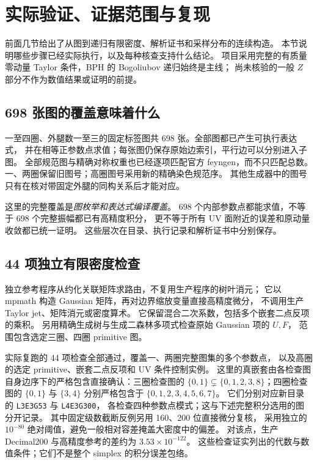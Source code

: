 \section{实际验证、证据范围与复现}

前面几节给出了从图到递归有限密度、解析证书和采样分布的连续构造。
本节说明哪些步骤已经实际执行，以及每种核查支持什么结论。
项目采用完整的有质量零动量 Taylor 条件，BPH 的 Bogoliubov 递归始终是主线；
尚未核验的一般 $Z$ 部分不作为数值结果或证明的前提。

\subsection{698 张图的覆盖意味着什么}

一至四圈、外腿数一至三的固定标签图共 698 张。全部图都已产生可执行表达式，
并在相等正参数点求值；每张图仍保存原始边索引，平行边可以分别进入子图。
全部规范图与精确对称权重也已经逐项匹配官方 feyngen，而不只匹配总数。
一、两圈保留旧图号；高圈图号采用新的精确染色规范序。
其他生成器中的图号只有在核对带固定外腿的同构关系后才能对应。

这里的完整覆盖是\emph{图枚举和表达式编译覆盖}。
698 个内部参数点都能求值，不等于 698 个完整振幅都已有高精度积分，
更不等于所有 UV 面附近的误差和原动量收敛都已统一证明。
这些层次在目录、执行记录和解析证书中分别保存。

\subsection{44 项独立有限密度检查}

独立参考程序从约化关联矩阵求路由，不复用生产程序的树叶消元；
它以 mpmath 构造 Gaussian 矩阵，再对边界缩放变量直接高精度微分，
不调用生产 Taylor jet、矩阵消元或密度算术。
它保留混合二次系数，包括多个嵌套二点反项的乘积。
另用精确生成树与生成二森林多项式检查原始 Gaussian 项的 $U,F$，
范围包含选定三圈、四圈 primitive 图。

实际复跑的 44 项检查全部通过，覆盖一、两圈完整图集的多个参数点，
以及高圈的选定 primitive、嵌套二点反项和 UV 条件控制实例。
这里的真嵌套由各检查图自身边序下的严格包含直接确认：三圈检查图的
$\{0,1\}\subsetneq\{0,1,2,3,8\}$；四圈检查图的
$\{0,1\}$ 与 $\{3,4\}$ 分别严格包含于 $\{0,1,2,3,4,5,6,7\}$。
它们分别对应新目录的 \texttt{L3E3G53} 与 \texttt{L4E3G300}，
各检查四种参数点模式；这与下述完整积分选用的图分开记录。
其中固定级数截断反例另用 160、200 位直接微分复核，
采用独立的 $10^{-80}$ 绝对阈值，避免一般相对容差掩盖大密度中的偏差。
对该点，生产 Decimal200 与高精度参考的差约为
$3.53\times10^{-122}$。
这些检查证实列出的代数与数值条件；它们不是整个 simplex 的积分误差包络。

